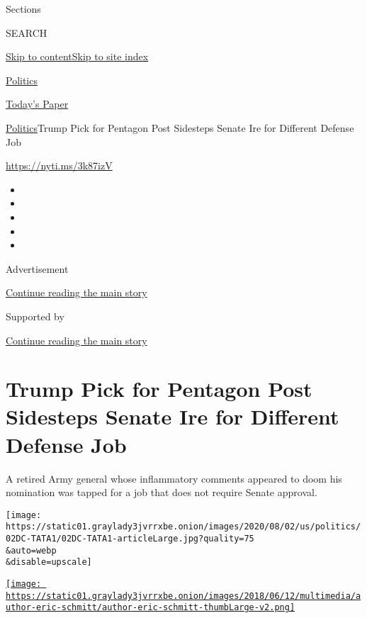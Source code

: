 Sections

SEARCH

\protect\hyperlink{site-content}{Skip to
content}\protect\hyperlink{site-index}{Skip to site index}

\href{https://www.nytimes3xbfgragh.onion/section/politics}{Politics}

\href{https://myaccount.nytimes3xbfgragh.onion/auth/login?response_type=cookie\&client_id=vi}{}

\href{https://www.nytimes3xbfgragh.onion/section/todayspaper}{Today's
Paper}

\href{/section/politics}{Politics}\textbar{}Trump Pick for Pentagon Post
Sidesteps Senate Ire for Different Defense Job

\url{https://nyti.ms/3k87izV}

\begin{itemize}
\item
\item
\item
\item
\item
\end{itemize}

Advertisement

\protect\hyperlink{after-top}{Continue reading the main story}

Supported by

\protect\hyperlink{after-sponsor}{Continue reading the main story}

\hypertarget{trump-pick-for-pentagon-post-sidesteps-senate-ire-for-different-defense-job}{%
\section{Trump Pick for Pentagon Post Sidesteps Senate Ire for Different
Defense
Job}\label{trump-pick-for-pentagon-post-sidesteps-senate-ire-for-different-defense-job}}

A retired Army general whose inflammatory comments appeared to doom his
nomination was tapped for a job that does not require Senate approval.

\texttt{[image: https://static01.graylady3jvrrxbe.onion/images/2020/08/02/us/politics/02DC-TATA1/02DC-TATA1-articleLarge.jpg?quality=75\\\&auto=webp\\\&disable=upscale]}

\href{https://www.nytimes3xbfgragh.onion/by/eric-schmitt}{\texttt{[image: https://static01.graylady3jvrrxbe.onion/images/2018/06/12/multimedia/author-eric-schmitt/author-eric-schmitt-thumbLarge-v2.png]}}

